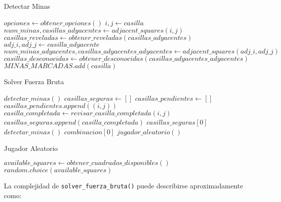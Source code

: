 \documentclass{article}
\begin{document}
\begin{algorithm}[H]
\caption{Detectar Minas}
\begin{algorithmic}[1]
\STATE $opciones \gets obtener\_opciones()$
    \STATE $i, j \gets casilla$
    \STATE $num\_minas, casillas\_adyacentes \gets adjacent\_squares(i, j)$
    \STATE $casillas\_reveladas \gets obtener\_reveladas(casillas\_adyacentes)$
        \STATE $adj\_i, adj\_j \gets casilla\_adyacente$
        \STATE $num\_minas\_adyacentes, casillas\_adyacentes\_adyacentes \gets adjacent\_squares(adj\_i, adj\_j)$
        \STATE $casillas\_desconocidas \gets obtener\_desconocidas(casillas\_adyacentes\_adyacentes)$
            \STATE $MINAS\_MARCADAS.add(casilla)$
        \ENDIF
    \ENDFOR
\ENDFOR
{}
\end{algorithmic}
\end{algorithm}
\begin{algorithm}[H]
\caption{Solver Fuerza Bruta}
\begin{algorithmic}[1]
\STATE $detectar\_minas()$
\STATE $casillas\_seguras \gets []$
\STATE $casillas\_pendientes \gets []$
            \STATE $casillas\_pendientes.append((i, j))$
        \ELSE
            \STATE $casilla\_completada \gets revisar\_casilla\_completada(i, j)$
                \STATE $casillas\_seguras.append(casilla\_completada)$
            \ENDIF
        \ENDIF
    \ENDFOR
\ENDFOR
{}
    \RETURN $casillas\_seguras[0]$
\ENDIF
\STATE $detectar\_minas()$
            \RETURN $combinacion[0]$
        \ENDIF
    \ENDFOR
\ENDFOR
\RETURN $jugador\_aleatorio()$
\end{algorithmic}
\end{algorithm}

\begin{algorithm}[H]
\caption{Jugador Aleatorio}
\begin{algorithmic}[1]
\STATE $available\_squares \gets obtener\_cuadrados\_disponibles()$
\RETURN $random.choice(available\_squares)$
\end{algorithmic}
\end{algorithm}
La complejidad de \texttt{solver\_fuerza\_bruta()} puede describirse aproximadamente como:
\end{document}
